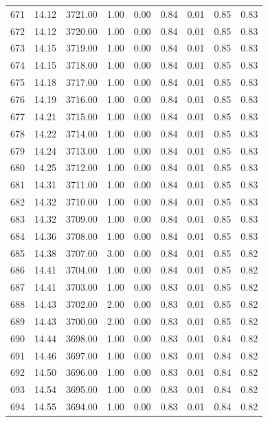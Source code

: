 \documentclass{article}\usepackage[]{graphicx}\usepackage[]{color}
\begin{document}
\begin{longtable}{rrrrrrrrr}
  671 & 14.12 & 3721.00 & 1.00 & 0.00 & 0.84 & 0.01 & 0.85 & 0.83 \\ 
  672 & 14.12 & 3720.00 & 1.00 & 0.00 & 0.84 & 0.01 & 0.85 & 0.83 \\ 
  673 & 14.15 & 3719.00 & 1.00 & 0.00 & 0.84 & 0.01 & 0.85 & 0.83 \\ 
  674 & 14.15 & 3718.00 & 1.00 & 0.00 & 0.84 & 0.01 & 0.85 & 0.83 \\ 
  675 & 14.18 & 3717.00 & 1.00 & 0.00 & 0.84 & 0.01 & 0.85 & 0.83 \\ 
  676 & 14.19 & 3716.00 & 1.00 & 0.00 & 0.84 & 0.01 & 0.85 & 0.83 \\ 
  677 & 14.21 & 3715.00 & 1.00 & 0.00 & 0.84 & 0.01 & 0.85 & 0.83 \\ 
  678 & 14.22 & 3714.00 & 1.00 & 0.00 & 0.84 & 0.01 & 0.85 & 0.83 \\ 
  679 & 14.24 & 3713.00 & 1.00 & 0.00 & 0.84 & 0.01 & 0.85 & 0.83 \\ 
  680 & 14.25 & 3712.00 & 1.00 & 0.00 & 0.84 & 0.01 & 0.85 & 0.83 \\ 
  681 & 14.31 & 3711.00 & 1.00 & 0.00 & 0.84 & 0.01 & 0.85 & 0.83 \\ 
  682 & 14.32 & 3710.00 & 1.00 & 0.00 & 0.84 & 0.01 & 0.85 & 0.83 \\ 
  683 & 14.32 & 3709.00 & 1.00 & 0.00 & 0.84 & 0.01 & 0.85 & 0.83 \\ 
  684 & 14.36 & 3708.00 & 1.00 & 0.00 & 0.84 & 0.01 & 0.85 & 0.83 \\ 
  685 & 14.38 & 3707.00 & 3.00 & 0.00 & 0.84 & 0.01 & 0.85 & 0.82 \\ 
  686 & 14.41 & 3704.00 & 1.00 & 0.00 & 0.84 & 0.01 & 0.85 & 0.82 \\ 
  687 & 14.41 & 3703.00 & 1.00 & 0.00 & 0.83 & 0.01 & 0.85 & 0.82 \\ 
  688 & 14.43 & 3702.00 & 2.00 & 0.00 & 0.83 & 0.01 & 0.85 & 0.82 \\ 
  689 & 14.43 & 3700.00 & 2.00 & 0.00 & 0.83 & 0.01 & 0.85 & 0.82 \\ 
  690 & 14.44 & 3698.00 & 1.00 & 0.00 & 0.83 & 0.01 & 0.84 & 0.82 \\ 
  691 & 14.46 & 3697.00 & 1.00 & 0.00 & 0.83 & 0.01 & 0.84 & 0.82 \\ 
  692 & 14.50 & 3696.00 & 1.00 & 0.00 & 0.83 & 0.01 & 0.84 & 0.82 \\ 
  693 & 14.54 & 3695.00 & 1.00 & 0.00 & 0.83 & 0.01 & 0.84 & 0.82 \\ 
  694 & 14.55 & 3694.00 & 1.00 & 0.00 & 0.83 & 0.01 & 0.84 & 0.82 \\ 

\end{longtable}
\end{document}
